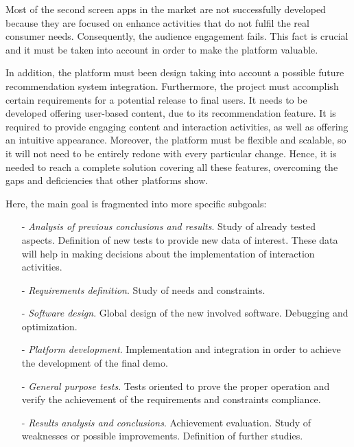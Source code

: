 \documentclass{acm_proc_article-sp}
\begin{document}
Most of the second screen apps in the market are not successfully developed because they are focused on enhance activities  that do not fulfil the real consumer needs\cite{evolumedia1}. Consequently, the audience engagement fails. This fact is crucial and it must be taken into account in order to make the platform valuable.

In addition, the platform must been design taking into account a possible future recommendation system integration. Furthermore, the project must accomplish certain requirements for a potential release to final users. It needs to be developed offering user-based content, due to its recommendation feature. It is required to provide engaging content and interaction activities, as well as offering an intuitive appearance. Moreover, the platform must be flexible and scalable, so it will not need to be entirely redone with every particular change. Hence, it is needed to reach a complete solution covering all these features, overcoming the gaps and deficiencies that other platforms show.

Here, the main goal is fragmented into more specific subgoals:

\begin{itemize}
  \item[-] \textit{Analysis of previous conclusions and results}. Study of already tested aspects. Definition of new tests to provide new data of interest. These data will help in making decisions about the implementation of interaction activities. 
  \item[-] \textit{Requirements definition}. Study of needs and constraints.
  \item[-] \textit{Software design}. Global design of the new involved software. Debugging and optimization.  
  \item[-] \textit{Platform development}. Implementation and integration in order to achieve the development of the final demo. 
  \item[-] \textit{General purpose tests}. Tests oriented to prove the proper operation and verify
the achievement of the requirements and constraints compliance.
  \item[-] \textit{Results analysis and conclusions}. Achievement evaluation. Study of weaknesses or possible improvements. Definition of further studies.
\end{itemize}
\end{document}
